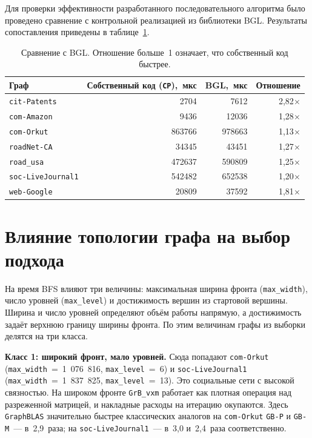 \documentclass[a4paper]{article}
\begin{document}
Для проверки эффективности разработанного последовательного алгоритма было проведено сравнение с контрольной реализацией из библиотеки BGL. Результаты сопоставления приведены в таблице~\ref{tab:bgl_verify}.

\begin{table}[h!]
\centering
\scriptsize
\setlength{\tabcolsep}{5pt}
\begin{tabular}{lrrr}
\toprule
Граф & Собственный код (\texttt{CP}),~мкс & BGL,~мкс & Отношение \\
\midrule
\texttt{cit-Patents}      & 2704   & 7612    & 2,82$\times$ \\
\texttt{com-Amazon}       & 9436   & 12036   & 1,28$\times$ \\
\texttt{com-Orkut}        & 863766 & 978663  & 1,13$\times$ \\
\texttt{roadNet-CA}       & 34345  & 43451   & 1,27$\times$ \\
\texttt{road\_usa}        & 472637 & 590809  & 1,25$\times$ \\
\texttt{soc-LiveJournal1} & 542482 & 652538  & 1,20$\times$ \\
\texttt{web-Google}       & 20809  & 37592   & 1,81$\times$ \\
\bottomrule
\end{tabular}
\caption{Сравнение с BGL. Отношение больше~1 означает, что собственный код быстрее.}
\label{tab:bgl_verify}
\end{table}

\section{Влияние топологии графа на выбор подхода}

На время BFS влияют три величины: максимальная ширина фронта (\texttt{max\_width}), число уровней (\texttt{max\_level}) и достижимость вершин из стартовой вершины. Ширина и число уровней определяют объём работы напрямую, а достижимость задаёт верхнюю границу ширины фронта. По этим величинам графы из выборки делятся на три класса.

\textbf{Класс 1: широкий фронт, мало уровней.} Сюда попадают \texttt{com-Orkut} (\texttt{max\_width}~=~1~076~816, \texttt{max\_level}~=~6) и \texttt{soc-LiveJournal1} (\texttt{max\_width}~=~1~837~825, \texttt{max\_level}~=~13). Это социальные сети с высокой связностью. На широком фронте \texttt{GrB\_vxm} работает как плотная операция над разреженной матрицей, и накладные расходы на итерацию окупаются. Здесь \texttt{GraphBLAS} значительно быстрее классических аналогов на \texttt{com-Orkut} \texttt{GB-P} и \texttt{GB-M}~--- в~2,9~раза; на \texttt{soc-LiveJournal1}~--- в~3,0 и~2,4~раза соответственно.
\end{document}
